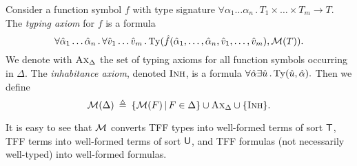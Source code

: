 \newcommand{\AxD}{\text{\sc Ax}_{\Delta}}
\newcommand{\Inh}{\text{\sc Inh}}
\newcommand{\Dom}{\mathrm{Dom}}

Consider a function symbol $f$ with type signature
$\forall \alpha_1\dots\alpha_n \,.\, T_1 \times \dots \times T_m \to T$.
The {\em typing axiom\/} for $f$ is a formula
$$
\forall \hat{\alpha}_1\dots\hat{\alpha}_n \,.\,
\forall \hat{v}_1\dots\hat{v}_m \,.\,
\mathrm{Ty}(\hat{f}(\hat{\alpha}_1,\dots,\hat{\alpha}_n,
\hat{v}_1,\dots,\hat{v}_m), \mathcal{M}(T)).
$$
We denote with $\AxD$ the set of typing axioms
for all function symbols occurring in $\Delta$.
The {\em inhabitance axiom}, denoted $\Inh$,
is a formula
$\forall \hat{\alpha} \exists \hat{u} \,.\,
\mathrm{Ty}(\hat{u},\hat{\alpha}).$
Then we define
$$
\MON(\Delta) \eqdef \{ \MON(F) \vb F \in \Delta \} \cup
\AxD \cup \{ \Inh \}.
$$

It is easy to see that $\mathcal{M}$ converts TFF types into well-formed
terms of sort $\mathsf{T}$, TFF terms into well-formed terms of sort $\mathsf{U}$,
and TFF formulas (not necessarily well-typed) into well-formed formulas.

